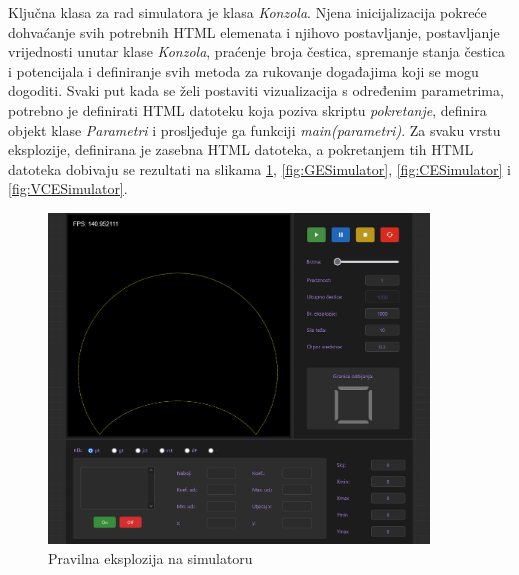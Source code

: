 \documentclass{foi}
\begin{document}
Ključna klasa za rad simulatora je klasa \textit{Konzola}. Njena inicijalizacija pokreće dohvaćanje svih potrebnih HTML elemenata i njihovo postavljanje, postavljanje vrijednosti unutar klase \textit{Konzola}, praćenje broja čestica, spremanje stanja čestica i potencijala i definiranje svih metoda za rukovanje događajima koji se mogu dogoditi. Svaki put kada se želi postaviti vizualizacija s određenim parametrima, potrebno je definirati HTML datoteku koja poziva skriptu \textit{pokretanje}, definira objekt klase \textit{Parametri} i prosljeđuje ga funkciji \textit{main(parametri)}. Za svaku vrstu eksplozije, definirana je zasebna HTML datoteka, a pokretanjem tih HTML datoteka dobivaju se rezultati na slikama \ref{fig:PESimulator}, \ref{fig:GESimulator}, \ref{fig:CESimulator} i \ref{fig:VCESimulator}.
\begin{figure}[H]
    \centering
    \includegraphics[width=0.9\textwidth]{slike/22_PESimulator.png}
    \captionsetup{justification=centering}
    \caption{Pravilna eksplozija na simulatoru}
\label{fig:PESimulator}
\end{figure}
\end{document}
